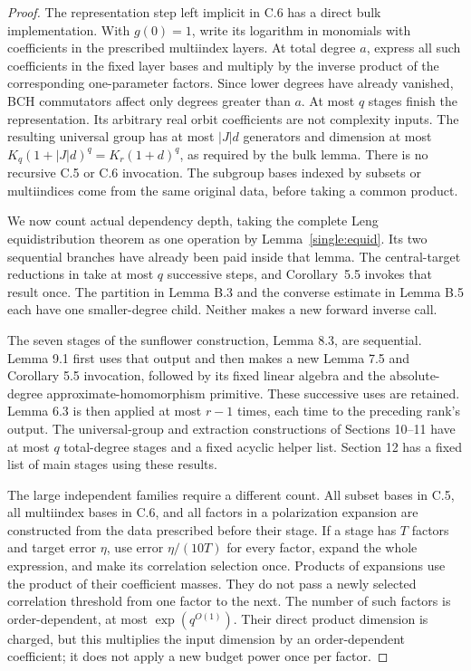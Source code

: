 \documentclass[11pt,a4paper]{article}
\theoremstyle{definition}
\begin{document}
\begin{proof}
The representation step left implicit in C.6 has a direct bulk
implementation. With \(g(0)=1\), write its logarithm in monomials
with coefficients in the prescribed multiindex layers. At total
degree \(a\), express all such coefficients in the fixed layer
bases and multiply by the inverse product of the corresponding
one-parameter factors. Since lower degrees have already vanished,
BCH commutators affect only degrees greater than \(a\). At most
\(q\) stages finish the representation. Its arbitrary real orbit
coefficients are not complexity inputs. The resulting universal
group has at most \(|J|d\) generators and dimension at most
\(K_q(1+|J|d)^q=K_r(1+d)^q\), as required by the bulk lemma.
There is no recursive C.5 or C.6 invocation. The subgroup bases
indexed by subsets or multiindices come from the same original
data, before taking a common product.

We now count actual dependency depth, taking the complete
Leng equidistribution theorem as one operation by
Lemma~\ref{single:equid}. Its two sequential branches have already
been paid inside that lemma. The central-target reductions in
\cite[Theorem 5.4]{lss} take at most \(q\) successive steps, and
Corollary~5.5 invokes that result once. The partition in Lemma B.3
and the converse estimate in Lemma B.5 each have one smaller-degree
child. Neither makes a new forward inverse call.

The seven stages of the sunflower construction, Lemma 8.3, are
sequential. Lemma 9.1 first uses that output and then makes a new
Lemma 7.5 and Corollary 5.5 invocation, followed by its fixed linear
algebra and the absolute-degree approximate-homomorphism primitive.
These successive uses are retained. Lemma 6.3 is then applied at most
\(r-1\) times, each time to the preceding rank's output. The
universal-group and extraction constructions of Sections 10--11
have at most \(q\) total-degree stages and a fixed acyclic helper
list. Section 12 has a fixed list of main stages using these results.

The large independent families require a different count. All subset
bases in C.5, all multiindex bases in C.6, and all factors in a
polarization expansion are constructed from the data prescribed
before their stage. If a stage has \(T\) factors and target error
\(\eta\), use error \(\eta/(10T)\) for every factor, expand the
whole expression, and make its correlation selection once. Products
of expansions use the product of their coefficient masses. They do
not pass a newly selected correlation threshold from one factor to
the next. The number of such factors is order-dependent, at most
\(\exp(q^{O(1)})\). Their direct product dimension is charged, but
this multiplies the input dimension by an order-dependent coefficient;
it does not apply a new budget power once per factor.


\end{proof}
\end{document}
